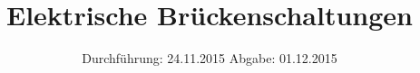 
\usepackage[frak=boondox]{mathalfa}
\subject{302}
\title{Elektrische Brückenschaltungen}
\date{
  Durchführung: 24.11.2015
  \hspace{3em}
  Abgabe: 01.12.2015
}



\maketitle
\newpage
\mbox{}
\newpage
\thispagestyle{empty}
\tableofcontents
\newpage





\nocite{numpy}
\nocite{matplotlib}
\nocite{uncertainties}
\printbibliography



